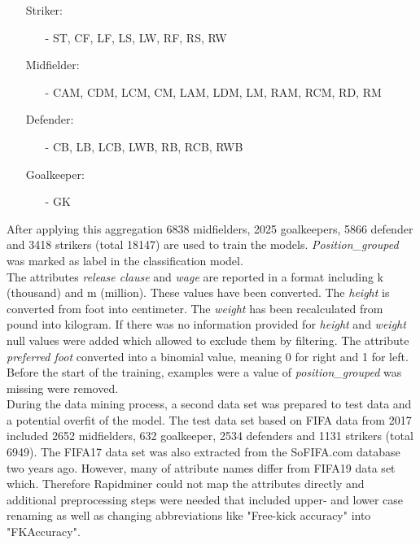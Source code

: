 \documentclass[runningheads]{llncs}
\begin{document}
\begin{itemize} 
\item[] Striker:
\begin{itemize}
\item[-] ST, CF, LF, LS, LW, RF, RS, RW
\end{itemize}
\item[] Midfielder:
\begin{itemize}
\item[-] CAM, CDM, LCM, CM, LAM, LDM, LM, RAM, RCM, RD, RM
\end{itemize}
\item[] Defender:
\begin{itemize} 
\item[-] CB, LB, LCB, LWB, RB, RCB, RWB
\end{itemize}
\item[] Goalkeeper:
\begin{itemize}
\item[-] GK
\end{itemize}
\end{itemize}
After applying this aggregation 6838 midfielders, 2025 goalkeepers, 5866 defender and 3418 strikers (total 18147) are used to train the models. \textit{Position\_grouped }was marked as label in the classification model.\\
The attributes\textit{ release clause} and \textit{wage} are reported in a format including k (thousand) and m (million). These values have been converted. The \textit{height} is converted from foot into centimeter. The \textit{weight} has been recalculated from pound into kilogram. If there was no information provided for \textit{height} and \textit{weight} null values were added which allowed to exclude them by filtering. The attribute \textit{preferred foot }converted into a binomial value, meaning 0 for right and 1 for left. %
Before the start of the training, examples were a value of \textit{position\_grouped} was missing were removed.\\
During the data mining process, a second data set was prepared to test data and a potential overfit of the model. The test data set based on FIFA data from 2017 included 2652 midfielders, 632 goalkeeper, 2534 defenders and 1131 strikers (total 6949).
The FIFA17 data set was also extracted from the SoFIFA.com database two years ago. However, many of attribute names differ from FIFA19 data set which. Therefore  Rapidminer could not map the attributes directly and additional preprocessing steps were needed that included upper- and lower case renaming as well as changing abbreviations like "Free-kick accuracy" into "FKAccuracy".
\end{document}
